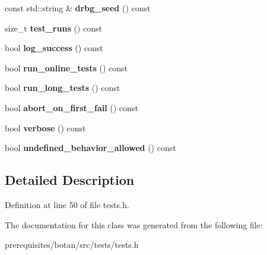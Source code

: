 \begin{DoxyCompactItemize}
const std\+::string \& {\bfseries drbg\+\_\+seed} () const
\item 
\mbox{\label{class_botan___tests_1_1_test___options_ad7677cf5067509919a2226ac3e365b73}} 
size\+\_\+t {\bfseries test\+\_\+runs} () const
\item 
\mbox{\label{class_botan___tests_1_1_test___options_aaa13ff8c7df76efdd0142f8a7fc9f8a6}} 
bool {\bfseries log\+\_\+success} () const
\item 
\mbox{\label{class_botan___tests_1_1_test___options_ad832cc6ea11f9207aae89a3d629a34a2}} 
bool {\bfseries run\+\_\+online\+\_\+tests} () const
\item 
\mbox{\label{class_botan___tests_1_1_test___options_a2624424e215624d06d6ef915e574c0b3}} 
bool {\bfseries run\+\_\+long\+\_\+tests} () const
\item 
\mbox{\label{class_botan___tests_1_1_test___options_a7ad8f463d7d57f57bb57af6742a8737a}} 
bool {\bfseries abort\+\_\+on\+\_\+first\+\_\+fail} () const
\item 
\mbox{\label{class_botan___tests_1_1_test___options_ac9890d53b88b116e41df53e55db06664}} 
bool {\bfseries verbose} () const
\item 
\mbox{\label{class_botan___tests_1_1_test___options_a702dc8cbdaae71a17289ff84d97b751b}} 
bool {\bfseries undefined\+\_\+behavior\+\_\+allowed} () const
\end{DoxyCompactItemize}


\subsection{Detailed Description}


Definition at line 50 of file tests.\+h.



The documentation for this class was generated from the following file\+:\begin{DoxyCompactItemize}
\item 
prerequisites/botan/src/tests/tests.\+h\end{DoxyCompactItemize}
